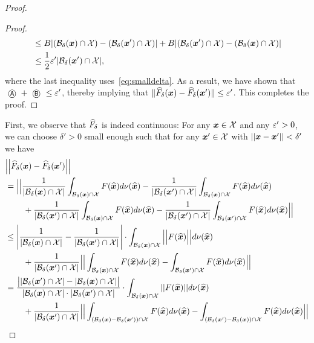 \begin{proof}
\begin{proof}
\begin{align*}
        &\leq B | ({\mathcal{B}}_\delta({\bm{x}}) \cap {\mathcal{X}} ) - ({\mathcal{B}}_\delta({\bm{x}}') \cap {\mathcal{X}}) | + B | ({\mathcal{B}}_\delta({\bm{x}}') \cap {\mathcal{X}}) - ({\mathcal{B}}_\delta({\bm{x}}) \cap {\mathcal{X}}) | \\
        &\leq \frac{1}{2} \varepsilon' | {\mathcal{B}}_\delta({\bm{x}}') \cap {\mathcal{X}}|,
    \end{align*}
    where the last inequality uses~\eqref{eq:smalldelta}. As a result, we have shown that $\tcircle{A} + \tcircle{B} \leq \epsilon'$, thereby implying that $\| \widehat{F}_\delta({\bm{x}}) - \widehat{F}_\delta({\bm{x}}') \| \leq \varepsilon'$. This completes the proof.
    \end{proof}
    \iffalse
    First, we observe that $\widehat{F}_\delta$ is indeed continuous: For any ${\bm{x}} \in {\mathcal{X}}$ and any $\varepsilon' >0$, we can choose $\delta'>0$ small enough such that for any ${\bm{x}}' \in {\mathcal{X}}$ with $||{\bm{x}} - {\bm{x}}'|| < \delta'$ we have
    \begin{align}
        &\Big|\Big| \hatF_\delta(\vx) - \hatF_\delta(\vx') \Big|\Big|
        \\
        &= \Big|\Big| \frac{1}{|\cB_{\delta}(\vx) \cap \cX|} \int_{\cB_{\delta}(\vx) \cap \cX} F(\hatvx) d\nu(\hatvx) - \frac{1}{|\cB_{\delta}(\vx') \cap \cX|} \int_{\cB_{\delta}(\vx) \cap \cX} F(\hatvx) d\nu(\hatvx) 
        \\
        &\, \quad \quad + \frac{1}{|\cB_{\delta}(\vx') \cap \cX|} \int_{\cB_{\delta}(\vx) \cap \cX} F(\hatvx) d\nu(\hatvx) - \frac{1}{|\cB_{\delta}(\vx') \cap \cX|} \int_{\cB_{\delta}(\vx') \cap \cX} F(\hatvx) d\nu(\hatvx) \Big|\Big|
        \\
        &\leq \Bigg| \frac{1}{|\cB_{\delta}(\vx) \cap \cX|} - \frac{1}{|\cB_{\delta}(\vx') \cap \cX|} \Bigg| \cdot \int_{\cB_{\delta}(\vx) \cap \cX} \Big|\Big| F(\hatvx) \Big|\Big| d\nu(\hatvx)
        \\
        &\, \quad \quad + \frac{1}{|\cB_{\delta}(\vx') \cap \cX|} \Big|\Big| \int_{\cB_{\delta}(\vx) \cap \cX} F(\hatvx) d\nu(\hatvx) - \int_{\cB_{\delta}(\vx') \cap \cX} F(\hatvx) d\nu(\hatvx) \Big|\Big|
        \\
        &= \frac{ \big| |\cB_{\delta}(\vx') \cap \cX| - |\cB_{\delta}(\vx) \cap \cX| \big|}{|\cB_{\delta}(\vx) \cap \cX| \cdot |\cB_{\delta}(\vx') \cap \cX|} \cdot \int_{\cB_{\delta}(\vx) \cap \cX} || F(\hatvx) || d\nu(\hatvx) 
        \\
        &\, \quad \quad + \frac{1}{|\cB_{\delta}(\vx') \cap \cX|} \Big|\Big| \int_{(\cB_{\delta}(\vx) \setminus \cB_{\delta}(\vx')) \cap \cX} F(\hatvx) d\nu(\hatvx) - \int_{(\cB_{\delta}(\vx') \setminus \cB_{\delta}(\vx)) \cap \cX} F(\hatvx) d\nu(\hatvx) \Big|\Big|

\end{align}
\end{proof}
